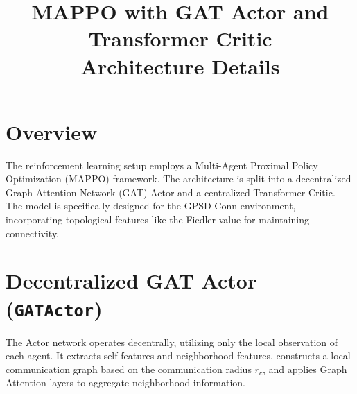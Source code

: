 \documentclass[11pt, a4paper]{article}
\begin{document}
\title{\textbf{MAPPO with GAT Actor and Transformer Critic \\ Architecture Details}}
\author{}
\date{}
\maketitle

\section{Overview}
The reinforcement learning setup employs a Multi-Agent Proximal Policy Optimization (MAPPO) framework. The architecture is split into a decentralized Graph Attention Network (GAT) Actor and a centralized Transformer Critic. The model is specifically designed for the GPSD-Conn environment, incorporating topological features like the Fiedler value for maintaining connectivity.

\section{Decentralized GAT Actor (\texttt{GATActor})}
The Actor network operates decentrally, utilizing only the local observation of each agent. It extracts self-features and neighborhood features, constructs a local communication graph based on the communication radius $r_c$, and applies Graph Attention layers to aggregate neighborhood information.
\end{document}
